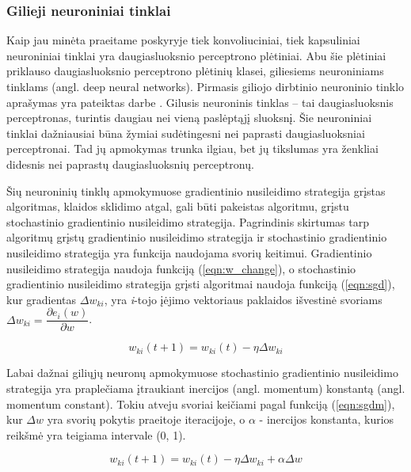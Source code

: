 \subsubsection{Gilieji neuroniniai tinklai}

Kaip jau minėta praeitame poskyryje tiek konvoliuciniai, tiek kapsuliniai neuroniniai tinklai yra daugiasluoksnio perceptrono plėtiniai. Abu šie plėtiniai priklauso daugiasluoksnio perceptrono plėtinių klasei, giliesiems neuroniniams tinklams (angl. deep neural networks). Pirmasis giliojo dirbtinio neuroninio tinklo aprašymas yra pateiktas darbe \cite{deepNN}. Gilusis neuroninis tinklas -- tai daugiasluoksnis perceptronas, turintis daugiau nei vieną paslėptąjį sluoksnį. Šie neuroniniai tinklai dažniausiai būna žymiai sudėtingesni nei paprasti daugiasluoksniai perceptronai. Tad jų apmokymas trunka ilgiau, bet jų tikslumas yra ženkliai didesnis nei paprastų daugiasluoksnių perceptronų.

Šių neuroninių tinklų apmokymuose gradientinio nusileidimo strategija grįstas algoritmas, klaidos sklidimo atgal, gali būti pakeistas algoritmu, grįstu stochastinio gradientinio nusileidimo strategija. Pagrindinis skirtumas tarp algoritmų grįstų gradientinio nusileidimo strategija ir stochastinio gradientinio nusileidimo strategija yra funkcija naudojama svorių keitimui. Gradientinio nusileidimo strategija naudoja funkciją (\ref{eqn:w_change}), o stochastinio gradientinio nusileidimo strategija grįsti algoritmai naudoja funkciją (\ref{eqn:sgd}), kur gradientas $\Delta w_{ki}$, yra \textit{i}-tojo įėjimo vektoriaus paklaidos išvestinė svoriams $\Delta w_{ki} = \dfrac{\partial e_i(w)}{\partial w}$.

\begin{equation}
\label{eqn:sgd}
	w_{ki}(t + 1) = w_{ki}(t) - \eta \Delta w_{ki}
\end{equation}

Labai dažnai giliųjų neuronų apmokymuose stochastinio gradientinio nusileidimo strategija yra praplečiama įtraukiant inercijos (angl. momentum) konstantą (angl. momentum constant). Tokiu atveju svoriai keičiami pagal funkciją (\ref{eqn:sgdm}), kur $\Delta w$ yra svorių pokytis praeitoje iteracijoje, o $\alpha$ - inercijos konstanta, kurios reikšmė yra teigiama intervale (0, 1).

\begin{equation}
\label{eqn:sgdm}
	w_{ki}(t + 1) = w_{ki}(t) - \eta \Delta w_{ki} + \alpha \Delta w
\end{equation}

